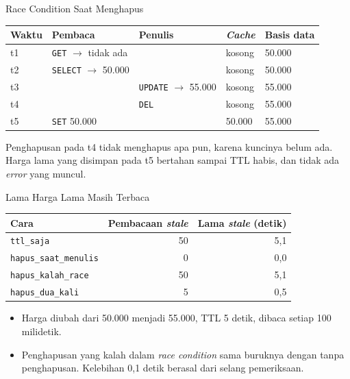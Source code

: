 \documentclass[aspectratio=169, table, 12pt]{beamer}
\begin{document}
\begin{frame}{{\Large Race Condition Saat Menghapus}}
  \vspace{4pt}
  \centering
  {\small
  \begin{tabularx}{\textwidth}{lXXll}
    \hline
    \textbf{Waktu} & \textbf{Pembaca} & \textbf{Penulis} & \textbf{\textit{Cache}} & \textbf{Basis data} \\
    \hline
    t1 & \texttt{GET} $\rightarrow$ tidak ada & & kosong & 50.000 \\
    \hline
    t2 & \texttt{SELECT} $\rightarrow$ 50.000 & & kosong & 50.000 \\
    \hline
    t3 & & \texttt{UPDATE} $\rightarrow$ 55.000 & kosong & 55.000 \\
    \hline
    t4 & & \texttt{DEL} & kosong & 55.000 \\
    \hline
    t5 & \texttt{SET} 50.000 & & 50.000 & 55.000 \\
    \hline
  \end{tabularx}}

  \vspace{8pt}
  {\footnotesize Penghapusan pada t4 tidak menghapus apa pun, karena kuncinya
  belum ada. Harga lama yang disimpan pada t5 bertahan sampai TTL habis, dan
  tidak ada \textit{error} yang muncul.}
\end{frame}

\begin{frame}{{\Large Lama Harga Lama Masih Terbaca}}
  \vspace{4pt}
  \centering
  {\small
  \begin{tabularx}{\textwidth}{Xrr}
    \hline
    \textbf{Cara} & \textbf{Pembacaan \textit{stale}} & \textbf{Lama \textit{stale} (detik)} \\
    \hline
    \texttt{ttl\_saja} & 50 & 5,1 \\
    \hline
    \texttt{hapus\_saat\_menulis} & 0 & 0,0 \\
    \hline
    \texttt{hapus\_kalah\_race} & 50 & 5,1 \\
    \hline
    \texttt{hapus\_dua\_kali} & 5 & 0,5 \\
    \hline
  \end{tabularx}}

  \vspace{6pt}
  \begin{itemize}
    \item Harga diubah dari 50.000 menjadi 55.000, TTL 5 detik, dibaca setiap
          100 milidetik.
    \item Penghapusan yang kalah dalam \textit{race condition} sama buruknya dengan tanpa
          penghapusan. Kelebihan 0,1 detik berasal dari selang pemeriksaan.
  \end{itemize}
\end{frame}
\end{document}
